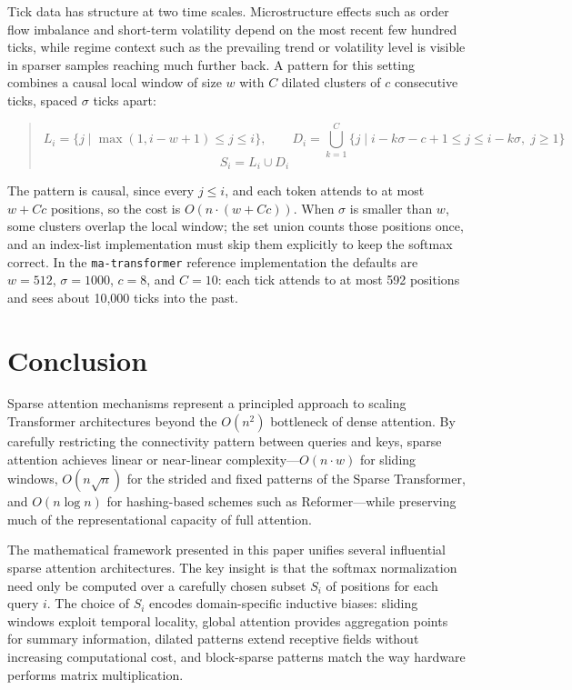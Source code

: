 \documentclass{article}
\begin{document}
Tick data has structure at two time scales. Microstructure effects such as order flow imbalance and short-term volatility depend on the most recent few hundred ticks, while regime context such as the prevailing trend or volatility level is visible in sparser samples reaching much further back. A pattern for this setting combines a causal local window of size \(w\) with \(C\) dilated clusters of \(c\) consecutive ticks, spaced \(\sigma\) ticks apart:
\begin{quote}
\[
L_i = \{j \mid \max(1, i - w + 1) \le j \le i \}, \qquad
D_i = \bigcup_{k=1}^{C} \{j \mid i - k\sigma - c + 1 \le j \le i - k\sigma, \; j \ge 1\}
\]
\[
S_i = L_i \cup D_i
\]
\end{quote}
The pattern is causal, since every \(j \le i\), and each token attends to at most \(w + C c\) positions, so the cost is \(O(n \cdot (w + Cc))\). When \(\sigma\) is smaller than \(w\), some clusters overlap the local window; the set union counts those positions once, and an index-list implementation must skip them explicitly to keep the softmax correct. In the \texttt{ma-transformer} reference implementation the defaults are \(w = 512\), \(\sigma = 1000\), \(c = 8\), and \(C = 10\): each tick attends to at most 592 positions and sees about 10,000 ticks into the past.


\section{Conclusion}

Sparse attention mechanisms represent a principled approach to scaling Transformer architectures beyond the \(O(n^2)\) bottleneck of dense attention. By carefully restricting the connectivity pattern between queries and keys, sparse attention achieves linear or near-linear complexity---\(O(n \cdot w)\) for sliding windows, \(O(n \sqrt{n})\) for the strided and fixed patterns of the Sparse Transformer, and \(O(n \log n)\) for hashing-based schemes such as Reformer---while preserving much of the representational capacity of full attention.

The mathematical framework presented in this paper unifies several influential sparse attention architectures. The key insight is that the softmax normalization need only be computed over a carefully chosen subset \(S_i\) of positions for each query \(i\). The choice of \(S_i\) encodes domain-specific inductive biases: sliding windows exploit temporal locality, global attention provides aggregation points for summary information, dilated patterns extend receptive fields without increasing computational cost, and block-sparse patterns match the way hardware performs matrix multiplication.
\end{document}
